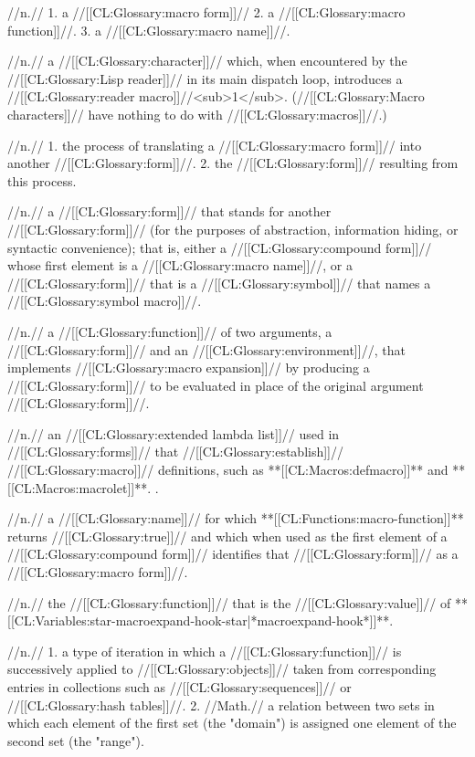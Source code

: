  //n.// 1. a //[[CL:Glossary:macro form]]// 2. a //[[CL:Glossary:macro function]]//. 3. a //[[CL:Glossary:macro name]]//.
 
 //n.// a //[[CL:Glossary:character]]// which, when encountered by the //[[CL:Glossary:Lisp reader]]// in its main dispatch loop, introduces a //[[CL:Glossary:reader macro]]//<sub>1</sub>. (//[[CL:Glossary:Macro characters]]// have nothing to do with //[[CL:Glossary:macros]]//.)

 //n.// 1. the process of translating a //[[CL:Glossary:macro form]]// into another //[[CL:Glossary:form]]//. 2. the //[[CL:Glossary:form]]// resulting from this process.
 
 //n.// a //[[CL:Glossary:form]]// that stands for another //[[CL:Glossary:form]]// (\eg for the purposes of abstraction, information hiding, or syntactic convenience); that is, either a //[[CL:Glossary:compound form]]// whose first element is a //[[CL:Glossary:macro name]]//, or a //[[CL:Glossary:form]]// that is a //[[CL:Glossary:symbol]]// that names a //[[CL:Glossary:symbol macro]]//.

 //n.// a //[[CL:Glossary:function]]// of two arguments, a //[[CL:Glossary:form]]// and an //[[CL:Glossary:environment]]//, that implements //[[CL:Glossary:macro expansion]]// by producing a //[[CL:Glossary:form]]// to be evaluated in place of the original argument //[[CL:Glossary:form]]//.
 
 //n.// an //[[CL:Glossary:extended lambda list]]// used in //[[CL:Glossary:forms]]// that //[[CL:Glossary:establish]]// //[[CL:Glossary:macro]]// definitions, such as **[[CL:Macros:defmacro]]** and **[[CL:Macros:macrolet]]**. \Seesection\MacroLambdaLists.

 //n.// a //[[CL:Glossary:name]]// for which **[[CL:Functions:macro-function]]** returns //[[CL:Glossary:true]]// and which when used as the first element of a //[[CL:Glossary:compound form]]// identifies that //[[CL:Glossary:form]]// as a //[[CL:Glossary:macro form]]//.
 
 //n.// the //[[CL:Glossary:function]]// that is the //[[CL:Glossary:value]]// of **[[CL:Variables:star-macroexpand-hook-star|*macroexpand-hook*]]**.

 //n.// 1. a type of iteration in which a //[[CL:Glossary:function]]// is successively applied to //[[CL:Glossary:objects]]// taken from corresponding entries in collections such as //[[CL:Glossary:sequences]]// or //[[CL:Glossary:hash tables]]//. 2. //Math.// a relation between two sets in which each element of the first set (the "domain") is assigned one element of the second set (the "range").

